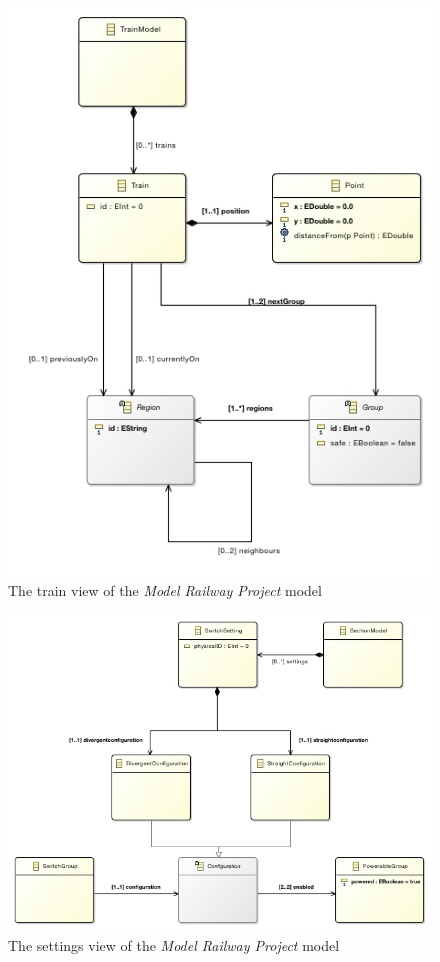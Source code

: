 \newpage
\begin{figure}[H]
	\hspace*{-1in}
	\centering
	\includegraphics[width=1.0\linewidth]{include/figures/chapter_6/metamodels/trainmodel}
	\caption{The train view of the \emph{Model Railway Project} model} 
	\label{fig:case_study:trainmodel}
\end{figure}
\newpage
\begin{figure}[H]
	\centering
	\includegraphics[width=1.2\linewidth]{include/figures/chapter_6/metamodels/settingmodel}
	\caption{The settings view of the \emph{Model Railway Project} model} 
	\label{fig:case_study:settingmodel}
\end{figure}

